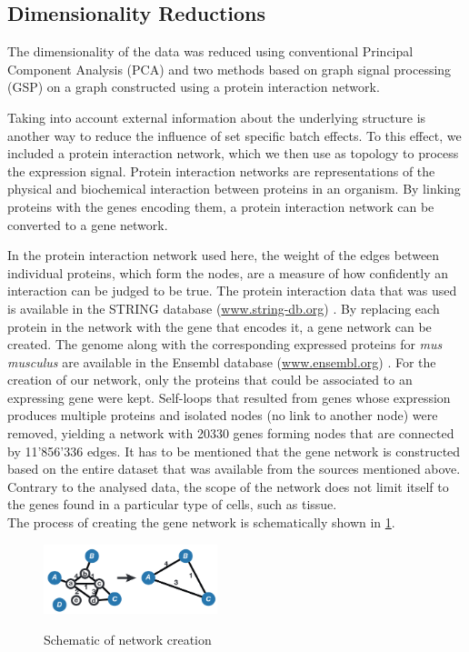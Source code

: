 \documentclass[10pt,conference,compsocconf]{IEEEtran}
\begin{document}
\subsection{Dimensionality Reductions}
The dimensionality of the data was reduced using conventional Principal Component Analysis (PCA) and two methods based on graph signal processing (GSP) on a graph constructed using a protein interaction network.
\par
Taking into account external information about the underlying structure is another way to reduce the influence of set specific batch effects. To this effect, we included a protein interaction network, which we then use as topology to process the expression signal. Protein interaction networks are representations of the physical and biochemical interaction between proteins in an organism. By linking proteins with the genes encoding them, a protein interaction network can be converted to a gene network. 
\par
In the protein interaction network used here, the weight of the edges between individual proteins, which form the nodes, are a measure of how confidently an interaction can be judged to be true. The protein interaction data that was used is available in the STRING database (\url{www.string-db.org}) \cite{Szklarczyk2016}. By replacing each protein in the network with the gene that encodes it, a gene network can be created. The genome along with the corresponding expressed proteins for \textit{mus musculus} are available in the Ensembl database (\url{www.ensembl.org}) \cite{Zerbino2017}. For the creation of our network, only the proteins that could be associated to an expressing gene were kept.
Self-loops that resulted from genes whose expression produces multiple proteins and isolated nodes (no link to another node) were removed, yielding a network with 20330 genes forming nodes that are connected by 11'856'336 edges. It has to be mentioned that the gene network is constructed based on the entire dataset that was available from the sources mentioned above. Contrary to the analysed data, the scope of the network does not limit itself to the genes found in a particular type of cells, such as tissue.  \\
The process of creating the gene network is schematically shown in \ref{fig:network_creation}.
\begin{figure}
	\centering
	\includegraphics[width=0.45\textwidth]{network.png}
	\label{fig:network_creation}
	\caption{Schematic of network creation}
\end{figure}
\end{document}

